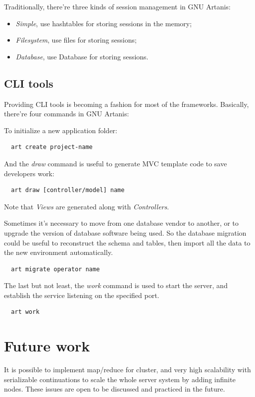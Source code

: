 \documentclass[numbers,numberedpars]{sigplanconf}
\begin{document}
Traditionally, there're three kinds of session management in GNU Artanis:

\begin{itemize}
\item {\it Simple}, use hashtables for storing sessions in the memory;
\item {\it Filesystem}, use files for storing sessions;
\item {\it Database}, use Database for storing sessions.
\end{itemize}

\subsection{CLI tools} \label{CLI tools}

Providing CLI tools is becoming a fashion for most of the frameworks.
Basically, there're four commands in GNU Artanis:

To initialize a new application folder:
\begin{lstlisting}
  art create project-name
\end{lstlisting}

And the {\it draw} command is useful to generate MVC template code to save developers work:
\begin{lstlisting}
  art draw [controller/model] name
\end{lstlisting}
Note that {\it Views} are generated along with {\it Controllers}.

Sometimes it's necessary to move from one database vendor to another, or to upgrade the version of database software being used.
So the database migration could be useful to reconstruct the schema and tables, then import all the data to the new environment automatically.
\begin{lstlisting}
  art migrate operator name
\end{lstlisting}

The last but not least, the {\it work} command is used to start the server, and establish the service listening on the specified port.
\begin{lstlisting}
  art work
\end{lstlisting}

\section{Future work}

It is possible to implement map/reduce for cluster, and very high scalability with serializable continuations to scale the whole server
system by adding infinite nodes. These issues are open to be discussed and practiced in the future.
\end{document}
